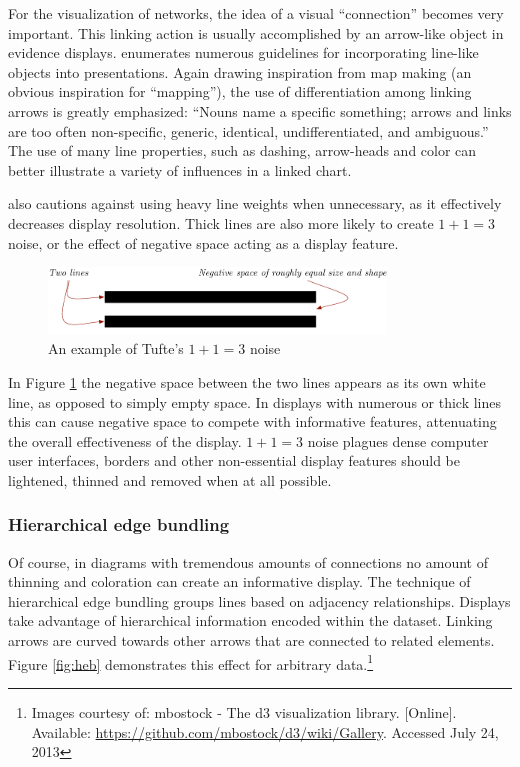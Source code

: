 For the visualization of networks, the idea of a visual ``connection'' becomes very important. This linking action is usually accomplished by an arrow-like object in evidence displays.  enumerates numerous guidelines for incorporating line-like objects into presentations. Again drawing inspiration from map making (an obvious inspiration for ``mapping''), the use of differentiation among linking arrows is greatly emphasized: ``Nouns name a specific something; arrows and links are too often non-specific, generic, identical, undifferentiated, and ambiguous.'' The use of many line properties, such as dashing, arrow-heads and color can better illustrate a variety of influences in a linked chart.

 also cautions against using heavy line weights when unnecessary, as it effectively decreases display resolution. Thick lines are also more likely to create $1 + 1 = 3$ noise, or the effect of negative space acting as a display feature.

\begin{figure}[ht]
\centering
	\includegraphics[width=0.8\textwidth]{figures/1and1equals3}
\caption{An example of Tufte's $1 + 1 = 3$ noise}
\label{fig:1and1equals3}
\end{figure}

In Figure \ref{fig:1and1equals3} the negative space between the two lines appears as its own white line, as opposed to simply empty space. In displays with numerous or thick lines this can cause negative space to compete with informative features, attenuating the overall effectiveness of the display. $1 + 1 = 3$ noise plagues dense computer user interfaces, borders and other non-essential display features should be lightened, thinned and removed when at all possible.

	\subsubsection{Hierarchical edge bundling}

Of course, in diagrams with tremendous amounts of connections no amount of thinning and coloration can create an informative display. The technique of hierarchical edge bundling \cite{HEB} groups lines based on adjacency relationships. Displays take advantage of hierarchical information encoded within the dataset. Linking arrows are curved towards other arrows that are connected to related elements. Figure \ref{fig:heb} demonstrates this effect for arbitrary data.\footnote{Images courtesy of: mbostock - The d3 visualization library. [Online]. Available: \url{https://github.com/mbostock/d3/wiki/Gallery}. Accessed July 24, 2013} 

